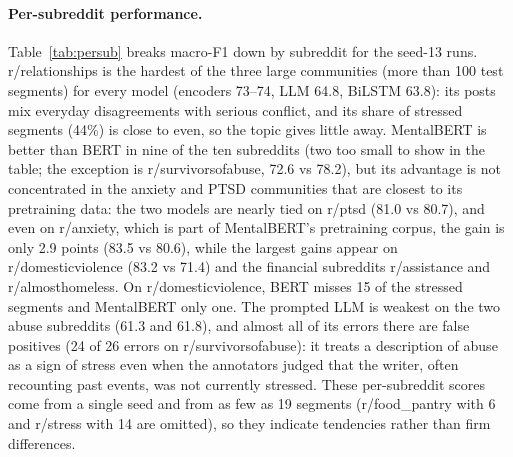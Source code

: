 \paragraph{Per-subreddit performance.}
Table~\ref{tab:persub} breaks macro-F1 down by subreddit for the seed-13 runs. r/relationships is the
hardest of the three large communities (more than 100 test segments) for every model (encoders 73--74,
LLM 64.8, BiLSTM 63.8): its posts mix
everyday disagreements with serious conflict, and its share of stressed segments (44\%) is close to
even, so the topic gives little away. MentalBERT is better than BERT in nine of the ten subreddits (two too small to show in the table; the exception is
r/survivorsofabuse, 72.6 vs 78.2), but its advantage is not concentrated in the anxiety and PTSD communities that are closest to its
pretraining data: the two models are nearly tied on r/ptsd (81.0 vs 80.7), and even on r/anxiety,
which is part of MentalBERT's pretraining corpus, the gain is only 2.9 points (83.5 vs 80.6), while the largest gains
appear on r/domesticviolence (83.2 vs 71.4) and the financial subreddits r/assistance and
r/almosthomeless. On r/domesticviolence, BERT misses 15 of the stressed segments and MentalBERT only
one. The prompted LLM is weakest on the two abuse subreddits (61.3 and 61.8), and almost all of its
errors there are false positives (24 of 26 errors on r/survivorsofabuse): it treats a description of
abuse as a sign of stress even when the annotators judged that the writer, often recounting past
events, was not currently stressed. These per-subreddit scores come from a single seed and from as
few as 19 segments (r/food\_pantry with 6 and r/stress with 14 are omitted), so they indicate
tendencies rather than firm differences.

